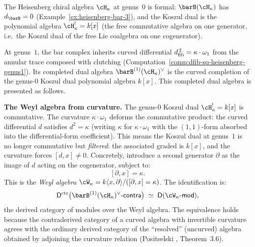 \begin{example}
\label{ex:heisenberg-curved-koszul}

The Heisenberg chiral algebra $\cH_\kappa$ at genus~$0$ is formal:
$\barB(\cH_\kappa)$ has $d_{\barB} = 0$
(Example~\ref{ex:heisenberg-bar-3}), and the Koszul dual is the
polynomial algebra $\cH_\kappa^! = k[x]$ (the free commutative
algebra on one generator, i.e.\ the Koszul dual of the free Lie
coalgebra on one cogenerator).

At genus~$1$, the bar complex inherits curved differential
$d_{\mathrm{fib}}^{\,2} = \kappa \cdot \omega_1$ from the annular trace
composed with clutching
\textup{(}Computation~\ref{comp:dfib-sq-heisenberg-genus1}\textup{)}.
Its completed dual algebra $\barB^{(1)}(\cH_\kappa)^\vee$ is the
curved completion of the genus-$0$ Koszul dual polynomial algebra
$k[x]$. This completed dual algebra is presented as follows.

\smallskip\noindent
\textbf{The Weyl algebra from curvature.}
The genus-$0$ Koszul dual $\cH_\kappa^! = k[x]$ is commutative. The
curvature $\kappa \cdot \omega_1$ deforms the commutative product:
the curved differential $d$ satisfies $d^2 = \kappa$
(writing $\kappa$ for $\kappa \cdot \omega_1$ with the $(1,1)$-form
absorbed into the differential-form coefficient). This means the
Koszul dual at genus~$1$ is no longer commutative but
\emph{filtered}: the associated graded is $k[x]$, and the curvature
forces $[d, x] \neq 0$. Concretely, introduce a second generator
$\partial$ as the image of $d$ acting on the cogenerator, subject to:
\begin{equation}\label{eq:weyl-from-curvature}
 [\partial, x] = \kappa.
\end{equation}
This is the \emph{Weyl algebra} $\cW_\kappa = k\langle x,
\partial\rangle / ([\partial, x] = \kappa)$. The identification is:
\begin{equation}\label{eq:curved-koszul-heisenberg}
 \Dctr\bigl(\barB^{(1)}(\cH_\kappa)^\vee\text{-}\mathsf{contra}\bigr)
 \;\simeq\;
 \mathsf{D}(\cW_\kappa\text{-}\mathsf{mod}),
\end{equation}
the derived category of modules over the Weyl algebra. The
equivalence holds because the contraderived category of a
curved algebra with invertible curvature agrees with the
ordinary derived category of the ``resolved'' (uncurved) algebra
obtained by adjoining the curvature relation
(Positselski \cite{Pos11}, Theorem~3.6).


\end{example}
